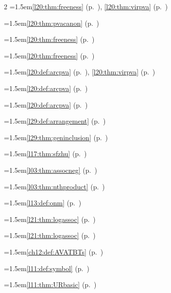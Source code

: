 \begin{multicols}{2}
\hangindent=1.5em\quad \ref{l20:thm:freeness} (p.~\pageref{l20:thm:freeness}), \ref{l20:thm:virpva} (p.~\pageref{l20:thm:virpva})\par
\hangindent=1.5em\quad \ref{l20:thm:pvacanon} (p.~\pageref{l20:thm:pvacanon})\par
\hangindent=1.5em\quad \ref{l20:thm:freeness} (p.~\pageref{l20:thm:freeness})\par
\hangindent=1.5em\quad \ref{l20:thm:freeness} (p.~\pageref{l20:thm:freeness})\par
\hangindent=1.5em\quad \ref{l20:def:arcpva} (p.~\pageref{l20:def:arcpva}), \ref{l20:thm:virpva} (p.~\pageref{l20:thm:virpva})\par
\hangindent=1.5em\quad \ref{l20:def:arcpva} (p.~\pageref{l20:def:arcpva})\par
\hangindent=1.5em\quad \ref{l20:def:arcpva} (p.~\pageref{l20:def:arcpva})\par
\hangindent=1.5em\quad \ref{l29:def:arrangement} (p.~\pageref{l29:def:arrangement})\par
\hangindent=1.5em\quad \ref{l29:thm:geninclusion} (p.~\pageref{l29:thm:geninclusion})\par
\hangindent=1.5em\quad \ref{l17:thm:sfzhu} (p.~\pageref{l17:thm:sfzhu})\par
\hangindent=1.5em\quad \ref{l03:thm:assocneg} (p.~\pageref{l03:thm:assocneg})\par
\hangindent=1.5em\quad \ref{l03:thm:nthproduct} (p.~\pageref{l03:thm:nthproduct})\par
\hangindent=1.5em\quad \ref{l13:def:onm} (p.~\pageref{l13:def:onm})\par
\hangindent=1.5em\quad \ref{l21:thm:logassoc} (p.~\pageref{l21:thm:logassoc})\par
\hangindent=1.5em\quad \ref{l21:thm:logassoc} (p.~\pageref{l21:thm:logassoc})\par
\hangindent=1.5em\quad \ref{ch12:def:AVATBTs} (p.~\pageref{ch12:def:AVATBTs})\par
\hangindent=1.5em\quad \ref{l11:def:symbol} (p.~\pageref{l11:def:symbol})\par
\hangindent=1.5em\quad \ref{l11:thm:URbasic} (p.~\pageref{l11:thm:URbasic})\par

\end{multicols}
